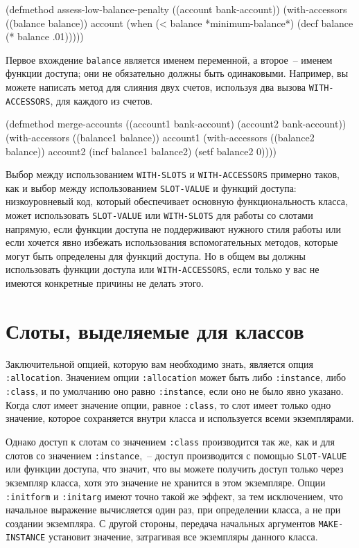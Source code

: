 \begin{myverb}
(defmethod assess-low-balance-penalty ((account bank-account))
  (with-accessors ((balance balance)) account
    (when (< balance *minimum-balance*)
      (decf balance (* balance .01)))))
\end{myverb}

Первое вхождение \lstinline{balance} является именем переменной, а второе~-- именем функции
доступа; они не обязательно должны быть одинаковыми.  Например, вы можете написать метод
для слияния двух счетов, используя два вызова \lstinline{WITH-ACCESSORS}, для каждого из
счетов.

\begin{myverb}
(defmethod merge-accounts ((account1 bank-account) (account2 bank-account))
  (with-accessors ((balance1 balance)) account1
    (with-accessors ((balance2 balance)) account2
      (incf balance1 balance2)
      (setf balance2 0))))
\end{myverb}

Выбор между использованием \lstinline{WITH-SLOTS} и \lstinline{WITH-ACCESSORS} примерно таков, как и
выбор между использованием \lstinline{SLOT-VALUE} и функций доступа: низкоуровневый код,
который обеспечивает основную функциональность класса, может использовать
\lstinline{SLOT-VALUE} или \lstinline{WITH-SLOTS} для работы со слотами напрямую, если функции
доступа не поддерживают нужного стиля работы или если хочется явно избежать использования
вспомогательных методов, которые могут быть определены для функций доступа.  Но в общем вы
должны использовать функции доступа или \lstinline{WITH-ACCESSORS}, если только у вас не
имеются конкретные причины не делать этого.

\section{Слоты, выделяемые для классов}

Заключительной опцией, которую вам необходимо знать, является опция \lstinline{:allocation}.
Значением опции \lstinline{:allocation} может быть либо \lstinline{:instance}, либо \lstinline{:class}, и
по умолчанию оно равно \lstinline{:instance}, если оно не было явно указано.  Когда слот имеет
значение опции, равное \lstinline{:class}, то слот имеет только одно значение, которое
сохраняется внутри класса и используется всеми экземплярами.

Однако доступ к слотам со значением \lstinline{:class} производится так же, как и для слотов со
значением \lstinline{:instance},~-- доступ производится с помощью \lstinline{SLOT-VALUE} или функции
доступа, что значит, что вы можете получить доступ только через экземпляр класса, хотя это
значение не хранится в этом экземпляре.  Опции \lstinline{:initform} и \lstinline{:initarg} имеют
точно такой же эффект, за тем исключением, что начальное выражение вычисляется один раз,
при определении класса, а не при создании экземпляра.  С другой стороны, передача
начальных аргументов \lstinline{MAKE-INSTANCE} установит значение, затрагивая все экземпляры
данного класса.

